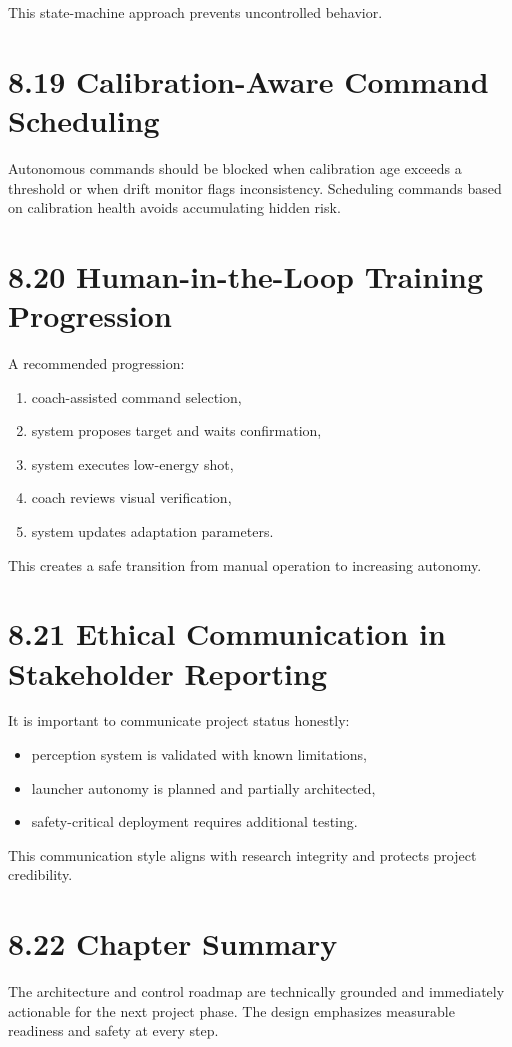 This state-machine approach prevents uncontrolled behavior.

\section{8.19 Calibration-Aware Command Scheduling}
Autonomous commands should be blocked when calibration age exceeds a threshold or when drift monitor flags inconsistency. Scheduling commands based on calibration health avoids accumulating hidden risk.

\section{8.20 Human-in-the-Loop Training Progression}
A recommended progression:
\begin{enumerate}
  \item coach-assisted command selection,
  \item system proposes target and waits confirmation,
  \item system executes low-energy shot,
  \item coach reviews visual verification,
  \item system updates adaptation parameters.
\end{enumerate}

This creates a safe transition from manual operation to increasing autonomy.

\section{8.21 Ethical Communication in Stakeholder Reporting}
It is important to communicate project status honestly:
\begin{itemize}
  \item perception system is validated with known limitations,
  \item launcher autonomy is planned and partially architected,
  \item safety-critical deployment requires additional testing.
\end{itemize}

This communication style aligns with research integrity and protects project credibility.

\section{8.22 Chapter Summary}
The architecture and control roadmap are technically grounded and immediately actionable for the next project phase. The design emphasizes measurable readiness and safety at every step.



